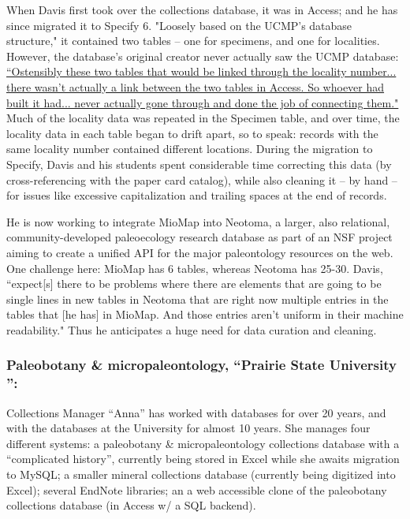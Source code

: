 When Davis first took over the collections database, it was in Access; and he has since migrated it to Specify 6. "Loosely based on the UCMP's database structure," it contained two tables – one for specimens, and one for localities. However, the database’s original creator never actually saw the UCMP database:
\href{http://}{“Ostensibly these two tables that would be linked through the locality number... there wasn't actually a link between the two tables in Access. So whoever had built it had... never actually gone through and done the job of connecting them."}
Much of the locality data was repeated in the Specimen table, and over time, the locality data in each table began to drift apart, so to speak: records with the same locality number contained different locations.  During the migration to Specify, Davis and his students spent considerable time correcting this data (by cross-referencing with the paper card catalog), while also cleaning it – by hand – for issues like excessive capitalization and trailing spaces at the end of records.  

He is now working to integrate MioMap into Neotoma, a larger, also relational, community-developed paleoecology research database as part of an NSF project aiming to create a unified API for the major paleontology resources on the web.  One challenge here: MioMap has 6 tables, whereas Neotoma has 25-30. Davis, “expect[s] there to be problems where there are elements that are going to be single lines in new tables in Neotoma that are right now multiple entries in the tables that [he has] in MioMap. And those entries aren't uniform in their machine readability."  Thus he anticipates a huge need for data curation and cleaning.


\subsubsection{Paleobotany & micropaleontology, “Prairie State University ”:}
 Collections Manager “Anna” has worked with databases for over 20 years, and with the databases at the University for almost 10 years.  She manages four different systems: a paleobotany & micropaleontology collections database with a “complicated history”, currently being stored in Excel while she awaits migration to MySQL; a smaller mineral collections database (currently being digitized into Excel); several EndNote libraries; an a web accessible clone of the paleobotany collections database (in Access w/ a SQL backend).

